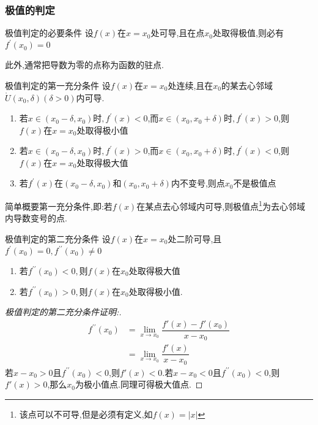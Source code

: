 \documentclass[8pt a4paper, oneside, UTF8]{ctexbook}  %
\begin{document}
\begin{sloppypar}
    \subsubsection{极值的判定}
    \begin{defn}{极值判定的必要条件}{}
        设$f(x)$在$x=x_0$处可导,且在点$x_0$处取得极值,则必有$f^{\prime}(x_0)=0$
    \end{defn}
    此外,通常把导数为零的点称为函数的驻点.
    \begin{defn}{极值判定的第一充分条件}{}
        设$f(x)$在$x=x_0$处连续,且在$x_0$的某去心邻域$\mathring U(x_0,\delta)(\delta>0)$内可导.
        \begin{enumerate}
            \item 若$x\in(x_0-\delta,x_0)$时$,f^\prime(x)<0$,而$x\in(x_0,x_0+\delta)$时$,f^\prime(x)>0$,则$f(x)$在$x=x_0$处取得极小值
            \item 若$x\in(x_0-\delta,x_0)$时$,f^\prime(x)>0$,而$x\in(x_0,x_0+\delta)$时$,f^\prime(x)<0$,则$f(x)$在$x=x_0$处取得极大值
            \item 若$f^\prime(x)$在$(x_0-\delta,x_0)$和$(x_0,x_0+\delta)$内不变号,则点$x_0$不是极值点
        \end{enumerate}
    \end{defn}
    简单概要第一充分条件,即:若$f(x)$在某点去心邻域内可导,则极值点\footnote{该点可以不可导,但是必须有定义,如$f(x)=|x|$}为去心邻域内导数变号的点.
    \begin{defn}{极值判定的第二充分条件}{}
        设$f(x)$在$x=x_0$处二阶可导,且$f^\prime(x_{0})=0,f^{\prime\prime}(x_{0})\neq0$
        \begin{enumerate}
            \item 若$f^{\prime\prime}(x_{0})<0,则f(x)$在$x_0$处取得极大值
            \item 若$f^{\prime\prime}(x_{0})>0,则f(x)$在$x_{0}$处取得极小值.
        \end{enumerate}
        \begin{proof}[极值判定的第二充分条件证明:]
            \begin{align*}
                f^{\prime\prime} (x_0) & =  \lim_{x\to x_0} \dfrac{f'(x)-f'(x_0)}{x-x_0} \\
                                       & = \lim_{x\to x_0} \dfrac{f'(x)}{x-x_0}
            \end{align*}
            若$x-x_0>0$且$f^{\prime\prime} (x_0)<0$,则$f'(x)<0$.若$x-x_0<0$且$f^{\prime\prime} (x_0)<0$,则$f'(x)>0$,那么$x_0$为极小值点.同理可得极大值点.
        \end{proof}

\end{defn}
\end{sloppypar}
\end{document}
